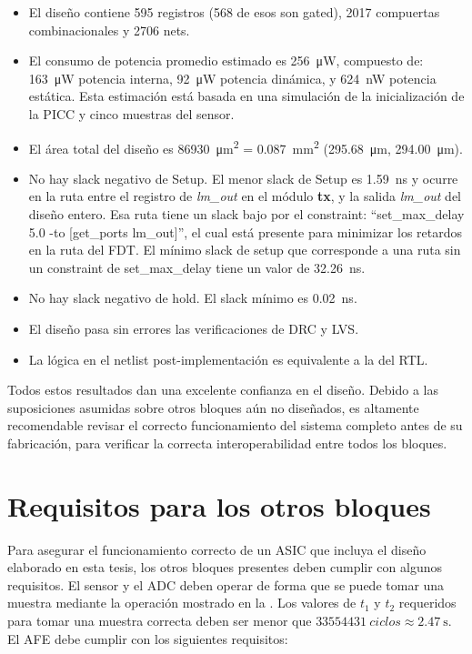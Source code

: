\documentclass[a4paper, twoside, 11pt]{report}
\begin{document}
\begin{itemize}
  \item El diseño contiene 595 registros (568 de esos son gated), 2017 compuertas combinacionales y 2706 nets.
  \item El consumo de potencia promedio estimado es \SI{256}{\micro\watt}, compuesto de: \SI{163}{\micro\watt} potencia interna, \SI{92}{\micro\watt} potencia dinámica, y \SI{624}{\nano\watt} potencia estática. Esta estimación está basada en una simulación de la inicialización de la PICC y cinco muestras del sensor.
  \item El área total del diseño es \SI{86930}{\micro\meter\squared} = \SI{0.087}{\milli\meter\squared} (\SI{295.68}{\micro\meter}, \SI{294.00}{\micro\meter}).
  \item No hay slack negativo de Setup. El menor slack de Setup es \SI{1.59}{\nano\second} y ocurre en la ruta entre el registro de \textit{lm\_out} en el módulo \textbf{tx}, y la salida \textit{lm\_out} del diseño entero. Esa ruta tiene un slack bajo por el constraint: “set\_max\_delay 5.0 -to [get\_ports lm\_out]”, el cual está presente para minimizar los retardos en la ruta del FDT. El mínimo slack de setup que corresponde a una ruta sin un constraint de set\_max\_delay tiene un valor de \SI{32.26}{\nano\second}.
  \item No hay slack negativo de hold. El slack mínimo es \SI{0.02}{\nano\second}.
  \item El diseño pasa sin errores las verificaciones de DRC y LVS.
  \item La lógica en el netlist post-implementación es equivalente a la del RTL.
\end{itemize}

Todos estos resultados dan una excelente confianza en el diseño. Debido a las suposiciones asumidas sobre otros bloques aún no diseñados, es altamente recomendable revisar el correcto funcionamiento del sistema completo antes de su fabricación, para verificar la correcta interoperabilidad entre todos los bloques.

\FloatBarrier
\section{Requisitos para los otros bloques}

Para asegurar el funcionamiento correcto de un ASIC que incluya el diseño elaborado en esta tesis, los otros bloques presentes deben cumplir con algunos requisitos. El sensor y el ADC deben operar de forma que se puede tomar una muestra mediante la operación mostrado en la . Los valores de $t_1$ y $t_2$ requeridos para tomar una muestra correcta deben ser menor que $\SI{33554431}{ciclos} \approx \SI{2.47}{\second}$. El AFE debe cumplir con los siguientes requisitos:
\end{document}
